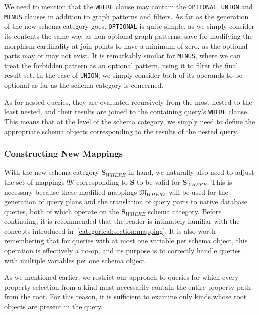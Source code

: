 We need to mention that the \texttt{WHERE} clause may contain the \texttt{OPTIONAL}, \texttt{UNION} and \texttt{MINUS} clauses in addition to graph patterns and filters.
As far as the generation of the new schema category goes, \texttt{OPTIONAL} is quite simple, as we simply consider its contents the same way as non-optional graph patterns, save for modifying the morphism cardinality at join points to have a minimum of zero, as the optional parts may or may not exist.
It is remarkably similar for \texttt{MINUS}, where we can treat the forbidden pattern as an optional pattern, using it to filter the final result set.
In the case of \texttt{UNION}, we simply consider both of its operands to be optional as far as the schema category is concerned.

As for nested queries, they are evaluated recursively from the most nested to the least nested, and their results are joined to the containing query's \texttt{WHERE} clause.
This means that at the level of the schema category, we simply need to define the appropriate schema objects corresponding to the results of the nested query.

\subsubsection{Constructing New Mappings}

With the new schema category $\mathbf{S}_{WHERE}$ in hand, we naturally also need to adjust the set of mappings $\mathfrak{M}$ corresponding to $\mathbf{S}$ to be valid for $\mathbf{S}_{WHERE}$.
This is necessary because these modified mappings $\mathfrak{M}_{WHERE}$ will be used for the generation of query plans and the translation of query parts to native database queries, both of which operate on the $\mathbf{S}_{WHERE}$ schema category.
Before continuing, it is recommended that the reader is intimately familiar with the concepts introduced in~\cref{categorical:section:mapping}.
It is also worth remembering that for queries with at most one variable per schema object, this operation is effectively a no-op, and its purpose is to correctly handle queries with multiple variables per one schema object.

As we mentioned earlier, we restrict our approach to queries for which every property selection from a kind must necessarily contain the entire property path from the root.
For this reason, it is sufficient to examine only kinds whose root objects are present in the query.

